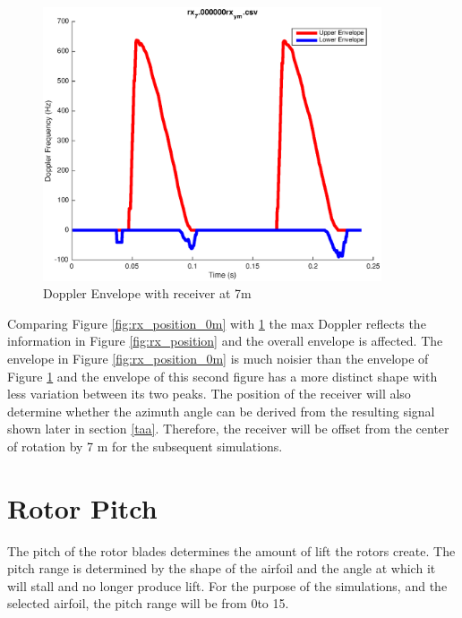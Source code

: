 \begin{figure}
	\begin{center}
		\includegraphics[width=10cm]{images/simulation/Doppler_Receiver_7m.eps}
		\caption{Doppler Envelope with receiver at 7m}
		\label{fig:rx_position_7m}
	\end{center}
\end{figure}

Comparing Figure \ref{fig:rx_position_0m} with \ref{fig:rx_position_7m} the max Doppler reflects the information in Figure \ref{fig:rx_position} and the overall envelope is affected. The envelope in Figure \ref{fig:rx_position_0m} is much noisier than the envelope of Figure \ref{fig:rx_position_7m} and the envelope of this second figure has a more distinct shape with less variation between its two peaks. The position of the receiver will also determine whether the azimuth angle can be derived from the resulting signal shown later in section \ref{taa}. Therefore, the receiver will be offset from the center of rotation by 7 m for the subsequent simulations.


\section{Rotor Pitch}
The pitch of the rotor blades determines the amount of lift the rotors create. The pitch range is determined by the shape of the airfoil and the angle at which it will stall and no longer produce lift. For the purpose of the simulations, and the selected airfoil, the pitch range will be from 0\textdegree  \space to 15\textdegree.

